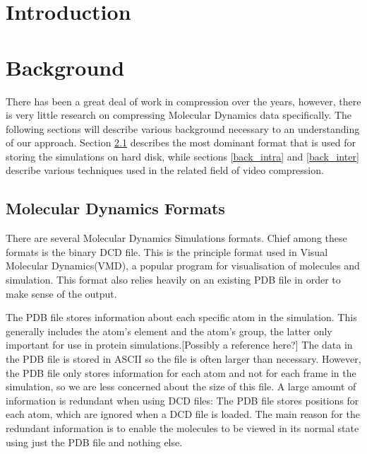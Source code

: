 \documentclass[a4paper,11pt]{report}
\begin{document}
\begin{titlepage}
 
\end{titlepage}

\begin{abstract}
 
\end{abstract}

\tableofcontents

\chapter{Introduction}

\chapter{Background}

There has been a great deal of work in compression over the years, however, there is very little research on compressing Molecular Dynamics data specifically.
The following sections will describe various background necessary to an understanding of our approach.
Section \ref{back_mdf} describes the most dominant format that is used for storing the simulations on hard disk,
while sections \ref{back_intra} and \ref{back_inter} describe various techniques used in the related field of video compression.

\section{Molecular Dynamics Formats}
\label{back_mdf}

There are several Molecular Dynamics Simulations formats. Chief among these formats is the binary DCD file. This is the principle format used in Visual Molecular Dynamics(VMD)\cite{vmd}, a popular program for visualisation of molecules and simulation. This format also relies heavily on an existing PDB file in order to make sense of the output.

The PDB file stores information about each specific atom in the simulation. This generally includes the atom's element and the atom's group, the latter only important for use in protein simulations.[Possibly a reference here?] The data in the PDB file is stored in ASCII so the file is often larger than necessary. However, the PDB file only stores information for each atom and not for each frame in the simulation, so we are less concerned about the size of this file. A large amount of information is redundant when using DCD files: The PDB file stores positions for each atom, which are ignored when a DCD file is loaded. The main reason for the redundant information is to enable the molecules to be viewed in its normal state using just the PDB file and nothing else.
\end{document}
